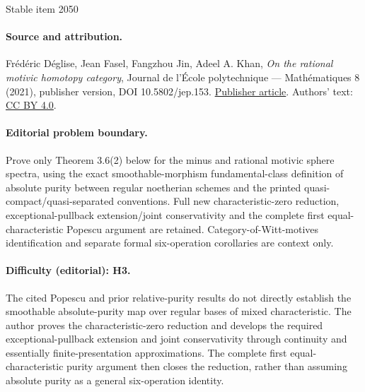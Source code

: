 \documentclass[11pt]{article}
\numberwithin{equation}{section}\renewcommand{\encodingdefault}{TU}
\begin{document}
\begin{center}{\Large Stable item 2050}\end{center}
\paragraph{Source and attribution.}
Frédéric Déglise, Jean Fasel, Fangzhou Jin, Adeel A. Khan, \emph{On the rational motivic homotopy category}, Journal de l’École polytechnique — Mathématiques 8 (2021), publisher version, DOI 10.5802/jep.153. \href{https://jep.centre-mersenne.org/articles/10.5802/jep.153/}{Publisher article}. Authors' text: \href{https://creativecommons.org/licenses/by/4.0/}{CC BY 4.0}.
\paragraph{Editorial problem boundary.}
Prove only Theorem 3.6(2) below for the minus and rational motivic sphere spectra, using the exact smoothable-morphism fundamental-class definition of absolute purity between regular noetherian schemes and the printed quasi-compact/quasi-separated conventions. Full new characteristic-zero reduction, exceptional-pullback extension/joint conservativity and the complete first equal-characteristic Popescu argument are retained. Category-of-Witt-motives identification and separate formal six-operation corollaries are context only.
\paragraph{Difficulty (editorial): H3.}
The cited Popescu and prior relative-purity results do not directly establish the smoothable absolute-purity map over regular bases of mixed characteristic. The author proves the characteristic-zero reduction and develops the required exceptional-pullback extension and joint conservativity through continuity and essentially finite-presentation approximations. The complete first equal-characteristic purity argument then closes the reduction, rather than assuming absolute purity as a general six-operation identity.
\end{document}
